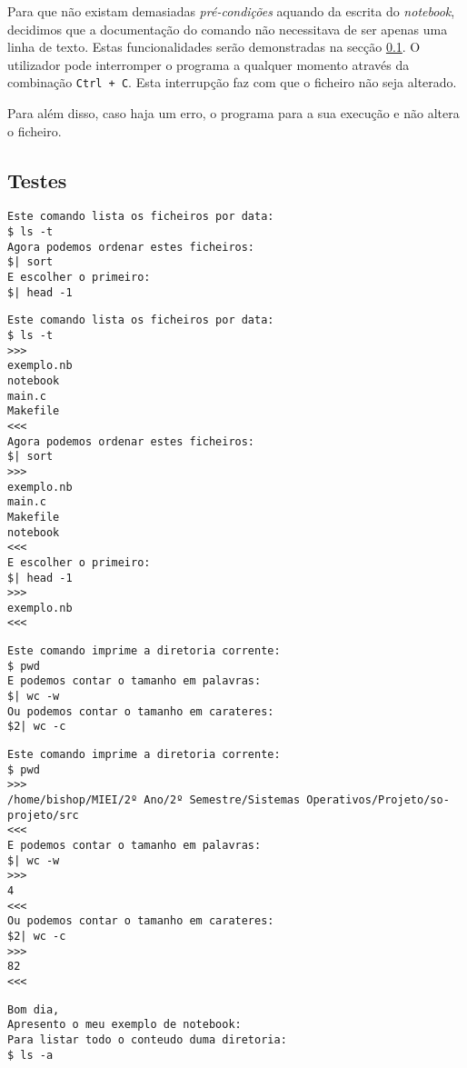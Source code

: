 \documentclass[a4paper]{article}
\begin{document}
Para que não existam demasiadas \textit{pré-condições} aquando da escrita do \textit{notebook}, decidimos que a documentação do 
comando não necessitava de ser apenas uma linha de texto.
Estas funcionalidades serão demonstradas na secção \ref{sec:testes}.
O utilizador pode interromper o programa a qualquer momento através da combinação \texttt{Ctrl + C}. Esta interrupção faz com que o 
ficheiro não seja alterado.

Para além disso, caso haja um erro, o programa para a sua execução e não altera o ficheiro.




\subsection{Testes}
\label{sec:testes}

\begin{lstlisting}[caption=1º Exemplo]
Este comando lista os ficheiros por data:
$ ls -t
Agora podemos ordenar estes ficheiros:
$| sort
E escolher o primeiro:
$| head -1
\end{lstlisting}

\begin{lstlisting}[caption=Resultado do 1º Exemplo]
Este comando lista os ficheiros por data:
$ ls -t
>>>
exemplo.nb
notebook
main.c
Makefile
<<<
Agora podemos ordenar estes ficheiros:
$| sort
>>>
exemplo.nb
main.c
Makefile
notebook
<<<
E escolher o primeiro:
$| head -1
>>>
exemplo.nb
<<<
\end{lstlisting}


\begin{lstlisting}[caption=2º Exemplo]
Este comando imprime a diretoria corrente:
$ pwd
E podemos contar o tamanho em palavras:
$| wc -w
Ou podemos contar o tamanho em carateres:
$2| wc -c
\end{lstlisting}


\begin{lstlisting}[caption=Resultado do 2º Exemplo]
Este comando imprime a diretoria corrente:
$ pwd
>>>
/home/bishop/MIEI/2º Ano/2º Semestre/Sistemas Operativos/Projeto/so-projeto/src
<<<
E podemos contar o tamanho em palavras:
$| wc -w
>>>
4
<<<
Ou podemos contar o tamanho em carateres:
$2| wc -c
>>>
82
<<<
\end{lstlisting}


\begin{lstlisting}[caption=3º Exemplo]
Bom dia,
Apresento o meu exemplo de notebook:
Para listar todo o conteudo duma diretoria:
$ ls -a
\end{lstlisting}
\end{document}
